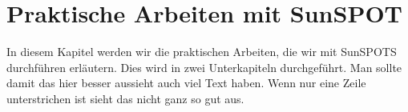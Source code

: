 \chapter{Praktische Arbeiten mit SunSPOT}\label{c:PraktischeArbeiten}

In diesem Kapitel werden wir die praktischen Arbeiten, die wir mit SunSPOTS durchführen erläutern. Dies wird in zwei Unterkapiteln durchgeführt. Man sollte damit das hier besser aussieht auch viel Text haben. Wenn nur eine Zeile unterstrichen ist sieht das nicht ganz so gut aus.




